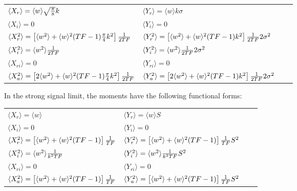 \vspace{-10pt}
\begin{center}
\begin{tabular}{llll}
$\langle X_r\rangle       = \langle w\rangle \sqrt{\pi\over8}k $ &
$\langle Y_r\rangle       = \langle w\rangle k\sigma $ \\
$\langle X_i\rangle       = 0 $ &
$\langle Y_i\rangle       = 0 $ \\
$\langle X_r^2\rangle     = \left[\langle w^2\rangle + \langle w\rangle^2(TF-1){\pi\over4}k^2\right]{1\over2TF} $ &
$\langle Y_r^2\rangle     = \left[\langle w^2\rangle + \langle w\rangle^2(TF-1)k^2\right]{1\over2TF}2\sigma^2 $ \\
$\langle X_i^2\rangle     = \langle w^2\rangle{1\over2TF} $ &
$\langle Y_i^2\rangle     = \langle w^2\rangle{1\over2TF}2\sigma^2 $ \\
$\langle X_{ri}\rangle    = 0 $ &
$\langle Y_{ri}\rangle    = 0 $ \\
$\langle X_a^2\rangle     = \left[2\langle w^2\rangle + \langle w\rangle^2(TF-1){\pi\over4}k^2\right]{1\over2TF} $ &
$\langle Y_a^2\rangle     = \left[2\langle w^2\rangle + \langle w\rangle^2(TF-1)k^2\right]{1\over2TF}2\sigma^2 $
\end{tabular}
\end{center}

\goodbreak

In the strong signal limit, the moments have the following functional
forms:

\vspace{-10pt}
\vspace{-10pt}
\begin{center}
\begin{tabular}{llll}
$\langle X_r\rangle       = \langle w\rangle $ &
$\langle Y_r\rangle       = \langle w\rangle S $ \\
$\langle X_i\rangle       = 0 $ &
$\langle Y_i\rangle       = 0 $ \\
$\langle X_r^2\rangle     = \left[\langle w^2\rangle + \langle w\rangle^2(TF-1)\right]{1\over TF} $ &
$\langle Y_r^2\rangle     = \left[\langle w^2\rangle + \langle w\rangle^2(TF-1)\right]{1\over TF}S^2 $ \\
$\langle X_i^2\rangle     = \langle w^2\rangle{1\over k^2TF} $ &
$\langle Y_i^2\rangle     = \langle w^2\rangle{1\over k^2TF}S^2 $ \\
$\langle X_{ri}\rangle    = 0 $ &
$\langle Y_{ri}\rangle    = 0 $ \\
$\langle X_a^2\rangle     = \left[\langle w^2\rangle + \langle w\rangle^2(TF-1)\right]{1\over TF} $ &
$\langle Y_a^2\rangle     = \left[\langle w^2\rangle + \langle w\rangle^2(TF-1)\right]{1\over TF}S^2 $
\end{tabular}
\end{center}
\vspace{-10pt}

